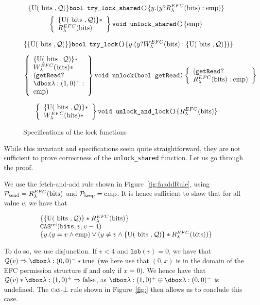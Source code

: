 \begin{figure}
		$$\{\text{U}(\text { bits }, \mathcal{Q})\} \texttt{bool try\_lock\_shared()}\{y. (y ? R_{\lambda}^{EFC}(\text{bits}) : \mathrm{emp})\}$$
\[
\left\{\begin{array}{l}\{\text{U}(\text { bits }, \mathcal{Q})\}* \\ {R_{\lambda}^{EFC}(\text{bits})}\end{array}\right\}
\texttt{void unlock\_shared()} \{\mathrm{emp}\} \]


$$\{\{\text{U}(\text { bits }, \mathcal{Q})\}\}\texttt{bool try\_lock()} \{y. (y ? W_{\lambda}^{EFC}(\text{bits}) : \{\text{U}(\text { bits }, \mathcal{Q})\})\}$$


\[
\left\{\begin{array}{l}\Uperm* \\ \wPerm* \\ (\texttt{getRead} ? \\ \ghost{\lambda: (1, 0)^+} : \\ \emp) \end{array}\right\}
\texttt{void unlock(bool getRead)}
\left\{\begin{array}{l}(\texttt{getRead} ? \\ \rPerm : \emp) \end{array}\right\} \]

\[
\left\{\begin{array}{l}\{\text{U}(\text { bits }, \mathcal{Q})\}* \\ W_{\lambda}^{EFC}(\text{bits})* \end{array}\right\}
\texttt{void unlock\_and\_lock()}
\{R_{\lambda}^{EFC}(\text{bits})\} \]
\caption{Specifications of the lock functions}
\label{fig:specRWFolly}
\end{figure}

While this invariant and specifications seem quite straightforward, they are not sufficient to prove correctness of the \texttt{unlock\_shared} function. Let us go through the proof.

We use the fetch-and-add rule shown in Figure~\ref{fig:faaddRule}, using $\mathcal{P}_{\text{send}} = R_{\lambda}^{EFC}(\text{bits})$ and $\mathcal{P}_{\text{keep}} = \mathrm{emp}$. It is hence sufficient to show that for all value $v$, we have that 

\[
\begin{array}{l}
\{\{\text{U}(\text { bits }, \mathcal{Q})\} * R_{\lambda}^{EFC}(\text{bits})\} \\
\texttt{CAS}^{\text{rel}}(\texttt{bits}, v, v - 4) \\
\{y. (y = v \land \mathrm{emp}) \lor (y \neq v \land \{\text{U}(\text { bits }, \mathcal{Q})\} * R_{\lambda}^{EFC}(\text{bits}))\}
\end{array}\]

To do so, we use disjunction.
If $v < 4$ and $\texttt{lsb}(v) = 0$, we have that $\mathcal{Q}(v) \Rightarrow \efcm{0}{0} * \text{true}$ (we here use that $(0, x)$ is in the domain of the EFC permission structure if and only if $x = 0$). We hence have that $\mathcal{Q}(v) * \efcp{1}{0} \Rightarrow \text{false}$, as $\efcp{1}{0} \oplus \efcm{0}{0}$ is undefined. The \textsc{cas}-$\bot$ rule shown in Figure~\ref{fig:} then allows us to conclude this case.

